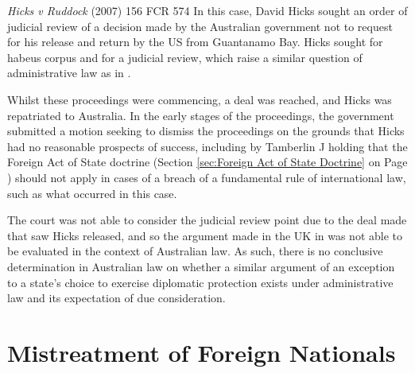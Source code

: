 \begin{casedetails}{\textit{Hicks v Ruddock} (2007) 156 FCR 574}
    \flushleft
    In this case, David Hicks sought an order of judicial review of a decision made by the Australian government not to request for his release and return by the US from Guantanamo Bay. Hicks sought for \gls{habeus corpus} and for a judicial review, which raise a similar question of administrative law as in .

    \vspace{\baselineskip}

    Whilst these proceedings were commencing, a deal was reached, and Hicks was repatriated to Australia. In the early stages of the proceedings, the government submitted a motion seeking to dismiss the proceedings on the grounds that Hicks had no reasonable prospects of success, including by Tamberlin J holding that the Foreign Act of State doctrine (Section \ref{sec:Foreign Act of State Doctrine} on Page \pageref{sec:Foreign Act of State Doctrine}) should not apply in cases of a breach of a fundamental rule of international law, such as what occurred in this case.
    
    \vspace{\baselineskip}
    
    The court was not able to consider the judicial review point due to the deal made that saw Hicks released, and so the argument made in the UK in  was not able to be evaluated in the context of Australian law. As such, there is no conclusive determination in Australian law on whether a similar argument of an exception to a state's choice to exercise diplomatic protection exists under administrative law and its expectation of due consideration.
\end{casedetails}

\section{Mistreatment of Foreign Nationals}
